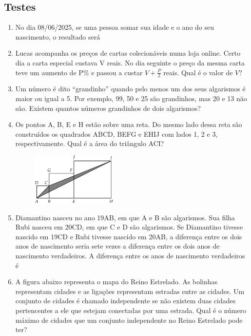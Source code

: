 \documentclass[12pt]{article}
\begin{document}
    \subsection{Testes}
      \begin{enumerate}[label=\textbf{\arabic*.}]
        \item No dia 08/06/2025, se uma pessoa somar sua idade e o ano do seu nascimento, o resultado será
        \item Lucas acompanha os preços de cartas colecionáveis numa loja online. Certo dia a carta especial custava V reais. No dia seguinte 
          o preço da mesma carta teve um aumento de P\% e passou a custar \(V + \tfrac{P}{2}\) reais. Qual é o valor de \(V\)?
        \item Um número é dito “grandinho” quando pelo menos um dos seus algarismos é maior ou igual a 5. Por exemplo, 99, 50 e 25 são 
          grandinhos, mas 20 e 13 não são. Existem quantos números grandinhos de dois algarismos?
        \item Os pontos A, B, E e H estão sobre uma reta. Do mesmo lado dessa reta são construídos os quadrados ABCD, BEFG e EHIJ com lados
          1, 2 e 3, respectivamente. Qual é a área do triângulo ACI?
          \begin{figure}[h]
            \centering
            \includegraphics[width=0.4\textwidth]{first.png}
          \end{figure}
        \item Diamantino nasceu no ano 19AB, em que A e B são algarismos. Sua filha Rubi nasceu em 20CD, em que C e D são algarismos. Se
          Diamantino tivesse nascido em 19CD e Rubi tivesse nascido em 20AB, a diferença entre os dois anos de nascimento seria sete vezes a
          diferença entre os dois anos de nascimento verdadeiros. A diferença entre os anos de nascimento verdadeiros é
        \item A figura abaixo representa o mapa do Reino Estrelado. As bolinhas representam cidades e as ligações representam estradas entre 
          as cidades. Um conjunto de cidades é chamado independente se não existem duas cidades pertencentes a ele que estejam conectadas por 
          uma estrada. Qual é o número máximo de cidades que um conjunto independente no Reino Estrelado pode ter?

\end{enumerate}
\end{document}
